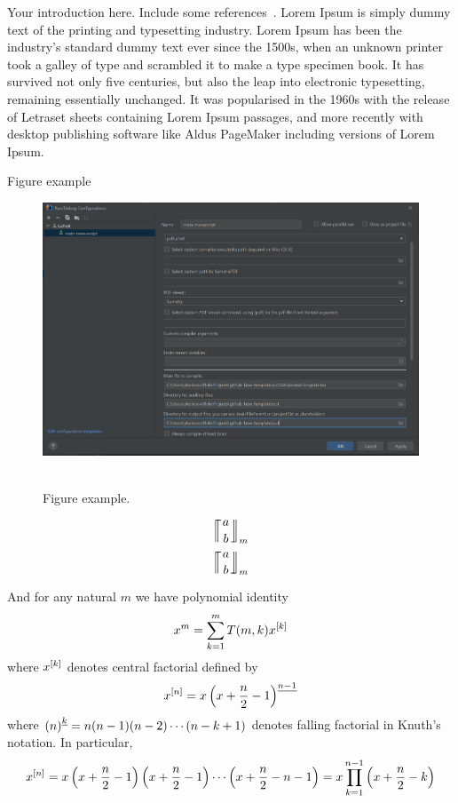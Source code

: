 Your introduction here.
Include some references~\cite{derivative_of_polynomials_via_double_limit,
    alekseyev2018mathoverflow,
    oeis_coefficients_u_m_l_k_defined_by_polynomial_identity_3}.
Lorem Ipsum is simply dummy text of the printing and typesetting industry.
Lorem Ipsum has been the industry's standard dummy text ever since the 1500s, when an unknown printer took a galley
of type and scrambled it to make a type specimen book.
It has survived not only five centuries, but also the leap into electronic typesetting, remaining essentially unchanged.
It was popularised in the 1960s with the release of Letraset sheets containing Lorem Ipsum passages, and more
recently with desktop publishing software like Aldus PageMaker including versions of Lorem Ipsum.

Figure example
\begin{figure}[H]
    \centering
    \includegraphics[width=1\textwidth]{sections/images/latex_configuration}
    ~\caption{Figure example.}\label{fig:figure}
\end{figure}



\begin{equation*}
    \llceil \nobarfrac{a}{b} \rrfloor_{m}
\end{equation*}
\begin{equation*}
    \llceilCoefficient{a}{b}{m}
\end{equation*}

And for any natural $m$ we have polynomial identity
\begin{equation}
    x^m = \sum_{k=1}^{m} T(m, k) x^{[k]}
    \label{eq:knuth-power-identity}
\end{equation}
where $x^{[k]}$ denotes central factorial defined by
\begin{equation*}
    x^{[n]} = x \left(x+\frac{n}{2}-1 \right)^{\underline{n-1}}
\end{equation*}
where $\left(n \right)^{\underline{k}} = n (n-1) (n-2) \cdots (n-k+1)$ denotes falling factorial in Knuth's notation.
In particular,
\begin{equation}
    x^{[n]}
    = x \left( x+\frac{n}{2}-1 \right) \left( x+\frac{n}{2}-1 \right) \cdots \left (x+\frac{n}{2}-n-1 \right)
    = x \prod_{k=1}^{n-1} \left( x+\frac{n}{2}-k \right)\label{eq:equation}
\end{equation}
